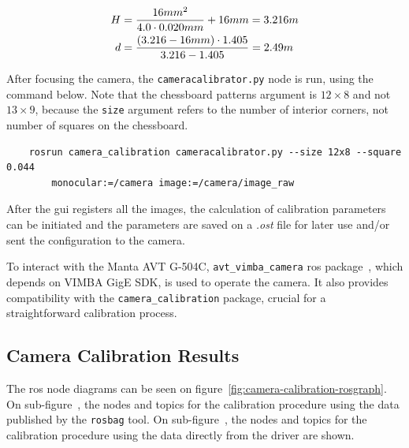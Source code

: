 \begin{subequations}
	\label{eq:hyperfocal-and-dof-values}
	\begin{align}
		H & = \frac{16mm^2}{4.0 \cdot 0.020mm} + 16mm  = 3.216 m \label{eq:hyperfocal-distance-value} \\
		\vspace{25mm}
		d & = \frac{(3.216 - 16mm) \cdot 1.405}{3.216 - 1.405} = 2.49m \label{eq:dof-subject-distance-value}
	\end{align}
\end{subequations}

After focusing the camera, the \texttt{cameracalibrator.py} node is run, using the command below. Note that the chessboard patterns argument is $12\times 8$ and not $13 \times 9$, because the \texttt{size} argument refers to the number of interior corners, not number of squares on the chessboard.


\begin{verbatim}
    rosrun camera_calibration cameracalibrator.py --size 12x8 --square 0.044  
        monocular:=/camera image:=/camera/image_raw
\end{verbatim}


After the \acf{gui} registers all the images, the calculation of calibration parameters can be initiated and the parameters are saved on a \textit{.ost} file for later use and/or sent the configuration to the camera. 

To interact with the Manta AVT G-504C, \texttt{avt\_vimba\_camera} \ac{ros} package~\cite{AVTROSdriver}, which depends on VIMBA GigE SDK, is used to operate the camera. It also provides compatibility with the \texttt{camera\_calibration} package, crucial for a straightforward calibration process.

\subsection{Camera Calibration Results}
The \ac{ros} node diagrams can be seen on figure~\ref{fig:camera-calibration-rosgraph}. On sub-figure~, the nodes and topics for the calibration procedure using the data published by the \texttt{rosbag} tool. On sub-figure~, the nodes and topics for the calibration procedure using the data directly from the driver are shown. 


